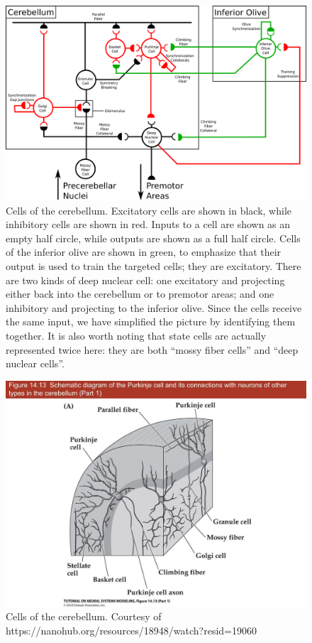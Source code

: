 \documentclass{article}
\theoremstyle{definition}
\begin{document}
\begin{figure}
\includegraphics[width=\linewidth]{cells.png}
\caption{Cells of the cerebellum. Excitatory cells are shown in black,
  while inhibitory cells are shown in red. Inputs to a cell are shown
  as an empty half circle, while outputs are shown as a full half
  circle.  Cells of the inferior olive are shown in green, to
  emphasize that their output is used to train the targeted cells;
  they are excitatory. There are two kinds of deep nuclear cell: one
  excitatory and projecting either back into the cerebellum or to
  premotor areas; and one inhibitory and projecting to the inferior
  olive. Since the cells receive the same input, we have simplified
  the picture by identifying them together. It is also worth noting
  that state cells are actually represented twice here: they are both
  ``mossy fiber cells'' and ``deep nuclear cells''.}
\label{fig-cells}
\end{figure}

\begin{figure}
\includegraphics[width=\linewidth]{nanohub/028.png}
\caption{Cells of the cerebellum. Courtesy of
  https://nanohub.org/resources/18948/watch?resid=19060}
\label{fig-physical-1}
\end{figure}
\end{document}
